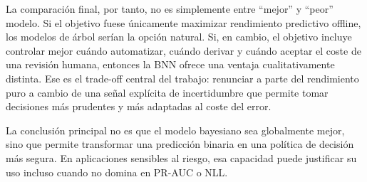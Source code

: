 \documentclass{article}
\begin{document}
La comparación final, por tanto, no es simplemente entre ``mejor'' y ``peor'' modelo. Si el objetivo fuese únicamente maximizar rendimiento predictivo offline, los modelos de árbol serían la opción natural. Si, en cambio, el objetivo incluye controlar mejor cuándo automatizar, cuándo derivar y cuándo aceptar el coste de una revisión humana, entonces la BNN ofrece una ventaja cualitativamente distinta. Ese es el trade-off central del trabajo: renunciar a parte del rendimiento puro a cambio de una señal explícita de incertidumbre que permite tomar decisiones más prudentes y más adaptadas al coste del error.

La conclusión principal no es que el modelo bayesiano sea globalmente mejor, sino que permite transformar una predicción binaria en una política de decisión más segura. En aplicaciones sensibles al riesgo, esa capacidad puede justificar su uso incluso cuando no domina en PR-AUC o NLL.

\newpage
\end{document}
